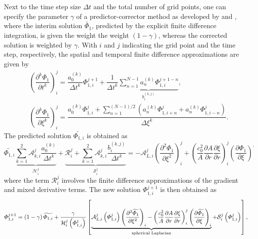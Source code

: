 Next to the time step size $\Delta t$ and the total number of grid points, one can specify the parameter $\gamma$ of a predictor-corrector method as developed by \citet{Dey_and_Dey_1983} and \citet{Nascimento_et_al_2010}, where the interim solution $\widetilde{\Phi_1}$, predicted by the explicit finite difference integration, is given the weight the weight $\left(1-\gamma\right)$, whereas the corrected solution is weighted by $\gamma$. With $i$ and $j$ indicating the grid point and the time step, respectively, the spatial and temporal finite difference approximations are given by
\begin{align}
&\left(\dfrac{\partial^k \Phi_1}{\partial t^k}\right)^{j}_{i}
=
\dfrac{a_0^{\left(k\right)}}{\Delta t^k} \Phi^{j+1}_{1,i}
+
\dfrac{1}{\Delta t^k}\underbrace{\sum_{n=1}^{N-1} a_n^{\left(k\right)}\Phi^{j+1-n}_{1,i}
}_{b^{\left(k,j\right)}_i},
\label{eq:fddt_compact} \\
& \left(\dfrac{\partial^k \Phi_1}{\partial \xi^k}\right)^{j}_{i}
=
\dfrac{\displaystyle a_0^{\left(k\right)}\Phi^{j}_{1,i} + \sum_{n=1}^{\left(N-1\right)/2} \left( a_n^{\left(k\right)}\Phi^{j}_{1,i+n} + a_{n}^{\left(k\right)}\Phi^{j}_{1,i-n}\right)}{\Delta\xi^k}.
\label{eq:fddxi_compact}
\end{align}
The predicted solution $\widetilde{\Phi_{1,i}}$ is obtained as
\begin{equation}
\widetilde{\Phi_{1,i}}\underbrace{\sum_{k=1}^2\mathcal{A}_{k,i}^j \dfrac{a_0^{\left(k\right)}}{\Delta t^k}}_{\mathcal{H}^j_i}
+
\underbrace{\mathcal{R}^j_i
+
\sum_{k=1}^2\mathcal{A}_{k,i}^j \dfrac{b^{\left(k,j\right)}_i}{\Delta t^k}}_{\mathcal{S}^j_i}
=
- \mathcal{A}^j_{L,i}\left(\dfrac{\partial^2 \Phi_1}{\partial \xi^2}\right)^j_i + \left(\dfrac{c_0^2}{A}\dfrac{\partial A}{\partial r} \dfrac{\partial \xi}{\partial r}\right)^j_i\left(\dfrac{\partial \Phi_1}{\partial \xi}\right)^,
\label{eq:discreteEqn}
\end{equation}
where the term $\mathcal{R}_i^j$ involves the finite difference approximations of the gradient and mixed derivative terms. The new solution $\Phi^{j+1}_{1,i}$ is then obtained as
\begin{equation}
\Phi^{j+1}_{1,i} = \left(1-\gamma\right)\widetilde{\Phi_{1,i}} + \dfrac{\gamma}{\mathcal{H}^j_i\left(\Phi_{1,i}^{j}\right)}\left[\underbrace{\mathcal{A}^j_{L,i}\left(\Phi_{1,i}^{j}\right)\left(\dfrac{\partial^2\widetilde{\Phi_1}}{\partial \xi^2}\right)_i - \left(\dfrac{c_0^2}{A}\dfrac{\partial A}{\partial r} \dfrac{\partial \xi}{\partial r}\right)^j_i\left(\dfrac{\partial \widetilde{\Phi_1}}{\partial \xi}\right)_i}_{\textnormal{spherical Laplacian}} + \mathcal{S}^j_i\left(\Phi_{1,i}^{j}\right)\right],
\label{eq:corrector}
\end{equation}
